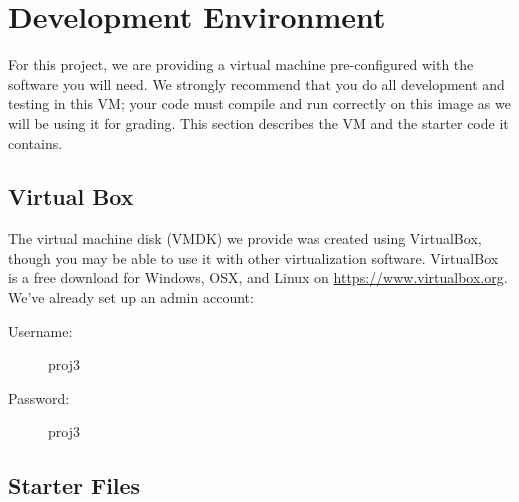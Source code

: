 \documentclass{article}
\begin{document}
\section{Development Environment}
\label{sec:starter}

For this project, we are providing a virtual machine pre-configured with the
software you will need. We strongly recommend that you do all development and
testing in this VM; your code must compile and run correctly on this image as
we will be using it for grading. This section describes the VM and the starter
code it contains.

\subsection{Virtual Box}

The virtual machine disk (VMDK) we provide was created using VirtualBox, though
you may be able to use it with other virtualization software. VirtualBox is a
free download for Windows, OSX, and Linux on \url{https://www.virtualbox.org}.
We've already set up an admin account:
\begin{description}
	\item[Username:] proj3
	\item[Password:] proj3
\end{description}


\subsection{Starter Files}
\label{sec:starter-files}
\end{document}

